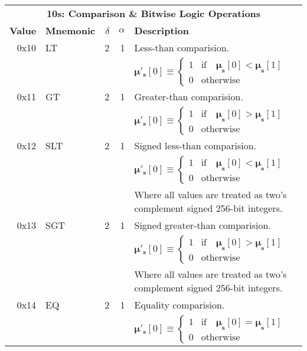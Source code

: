 \documentclass[9pt,oneside]{amsart}
\begin{document}
\begin{tabular*}{\columnwidth}[h]{rlrrl}
\toprule
\multicolumn{5}{c}{\textbf{10s: Comparison \& Bitwise Logic Operations}} \\
\textbf{Value} & \textbf{Mnemonic} & $\delta$ & $\alpha$ & \textbf{Description} \vspace{5pt} \\
0x10 & {\small LT} & 2 & 1 & Less-than comparision. \\
&&&& $\boldsymbol{\mu}'_\mathbf{s}[0] \equiv \begin{cases} 1 & \text{if} \quad \boldsymbol{\mu}_\mathbf{s}[0] < \boldsymbol{\mu}_\mathbf{s}[1] \\ 0 & \text{otherwise} \end{cases}$ \\
\midrule
0x11 & {\small GT} & 2 & 1 & Greater-than comparision. \\
&&&& $\boldsymbol{\mu}'_\mathbf{s}[0] \equiv \begin{cases} 1 & \text{if} \quad \boldsymbol{\mu}_\mathbf{s}[0] > \boldsymbol{\mu}_\mathbf{s}[1] \\ 0 & \text{otherwise} \end{cases}$ \\
\midrule
0x12 & {\small SLT} & 2 & 1 & Signed less-than comparision. \\
&&&& $\boldsymbol{\mu}'_\mathbf{s}[0] \equiv \begin{cases} 1 & \text{if} \quad \boldsymbol{\mu}_\mathbf{s}[0] < \boldsymbol{\mu}_\mathbf{s}[1] \\ 0 & \text{otherwise} \end{cases}$ \\
&&&& Where all values are treated as two's complement signed 256-bit integers. \\
\midrule
0x13 & {\small SGT} & 2 & 1 & Signed greater-than comparision. \\
&&&& $\boldsymbol{\mu}'_\mathbf{s}[0] \equiv \begin{cases} 1 & \text{if} \quad \boldsymbol{\mu}_\mathbf{s}[0] > \boldsymbol{\mu}_\mathbf{s}[1] \\ 0 & \text{otherwise} \end{cases}$ \\
&&&& Where all values are treated as two's complement signed 256-bit integers. \\
\midrule
0x14 & {\small EQ} & 2 & 1 & Equality comparision. \\
&&&& $\boldsymbol{\mu}'_\mathbf{s}[0] \equiv \begin{cases} 1 & \text{if} \quad \boldsymbol{\mu}_\mathbf{s}[0] = \boldsymbol{\mu}_\mathbf{s}[1] \\ 0 & \text{otherwise} \end{cases}$ \\

\end{tabular*}
\end{document}
